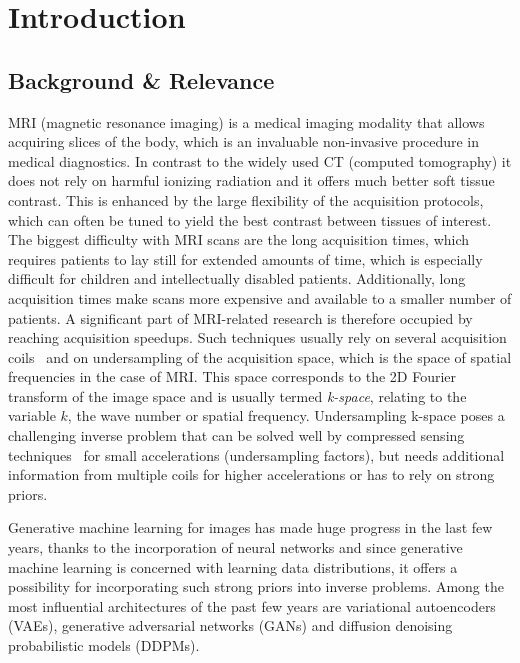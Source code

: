 %


\chapter{Introduction}
\section{Background \& Relevance}
MRI (magnetic resonance imaging) is a medical imaging modality that allows acquiring slices of the body, which is an invaluable non-invasive procedure in medical diagnostics. In contrast to the widely used CT (computed tomography) it does not rely on harmful ionizing radiation and it offers much better soft tissue contrast. This is enhanced by the large flexibility of the acquisition protocols, which can often be tuned to yield the best contrast between tissues of interest. The biggest difficulty with MRI scans are the long acquisition times, which requires patients to lay still for extended amounts of time, which is especially difficult for children and intellectually disabled patients. Additionally, long acquisition times make scans more expensive and available to a smaller number of patients. A significant part of MRI-related research is therefore occupied by reaching acquisition speedups. Such techniques usually rely on several acquisition coils~\autocite{sodickson1997smash,pruessmann1999sense,griswold2002grappa} and on undersampling of the acquisition space, which is the space of spatial frequencies in the case of MRI. This space corresponds to the 2D Fourier transform of the image space and is usually termed \textit{k-space}, relating to the variable $k$, the wave number or spatial frequency. Undersampling k-space poses a challenging inverse problem that can be solved well by compressed sensing techniques~\autocite{donoho2006compressedsensing,candes2005stable} for small accelerations (undersampling factors), but needs additional information from multiple coils for higher accelerations or has to rely on strong priors.

Generative machine learning for images has made huge progress in the last few years, thanks to the incorporation of neural networks and since generative machine learning is concerned with learning data distributions, it offers a possibility for incorporating such strong priors into inverse problems. Among the most influential architectures of the past few years are variational autoencoders (VAEs), generative adversarial networks (GANs) and diffusion denoising probabilistic models (DDPMs).~\autocite{kingma2013autoencoding,goodfellow2014generative,sohldickstein2015deep,ho2020denoising}

